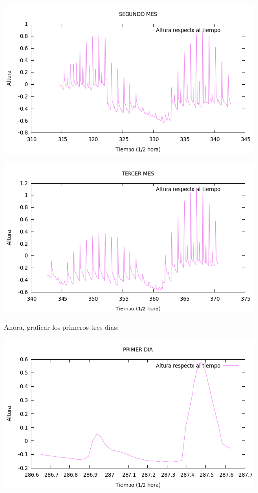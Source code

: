 \documentclass[12pt]{article}
\begin{document}
\begin{center}
	\includegraphics[width=15cm]{graf2m.png}\\
\end{center}	

\begin{center}
	\includegraphics[width=15cm]{graf3m.png}\\
\end{center}	

Ahora, graficar los primeros tres días:


\begin{center}
	\includegraphics[width=14cm]{graf1d.png}\\
\end{center}	
\end{document}
